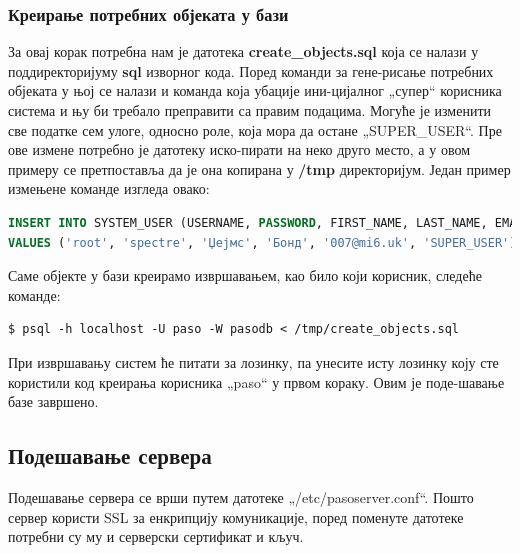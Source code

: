 \documentclass[a4paper, 12pt, diplomski]{etfcyr}
\def\quote#1{„#1“}
\begin{document}
					\subsubsection*{Креирање потребних објеката у бази}
						\begin{justify}
							За овај корак потребна нам је датотека \textbf{create\_objects.sql} која се налази у поддиректоријуму \textbf{sql} изворног кода. Поред команди за гене-рисање потребних објеката у њој се налази и команда која убације ини-цијалног \quote{супер} корисника система и њу би требало преправити са правим подацима. Могуће је изменити све податке сем улоге, односно роле, која мора да остане \quote{SUPER\_USER}. Пре ове измене потребно је датотеку иско-пирати на неко друго место, а у овом примеру се претпоставља да је она копирана у \textbf{/tmp} директоријум. Један пример измењене команде изгледа овако:
							\begin{lstlisting}[language=SQL,basicstyle=\scriptsize\ttfamily,frame=none]
INSERT INTO SYSTEM_USER (USERNAME, PASSWORD, FIRST_NAME, LAST_NAME, EMAIL, ROLE)
VALUES ('root', 'spectre', 'Џејмс', 'Бонд', '007@mi6.uk', 'SUPER_USER');
							\end{lstlisting}
							Саме објекте у бази креирамо извршавањем, као било који корисник, следеће команде:
							\begin{footnotesize}
								\begin{verbatim}
$ psql -h localhost -U paso -W pasodb < /tmp/create_objects.sql
								\end{verbatim}
							\end{footnotesize}
							При извршавању систем ће питати за лозинку, па унесите исту лозинку коју сте користили код креирања корисника \quote{paso} у првом кораку. Овим је поде-шавање базе завршено.
						\end{justify}

				\subsection{Подешавање сервера}
					\begin{justify}
						Подешавање сервера се врши путем датотеке \quote{/etc/pasoserver.conf}. Пошто сервер користи SSL за енкрипцију комуникације, поред поменуте датотеке потребни су му и серверски сертификат и кључ.
					\end{justify}
\end{document}
